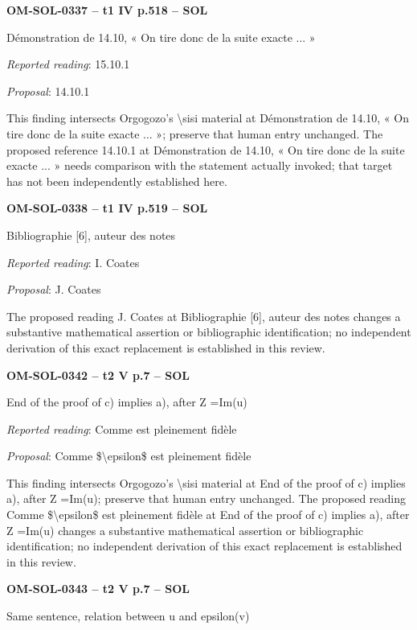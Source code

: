 \par\noindent\textbf{OM-SOL-0337 -- t1 IV p.518 -- SOL}\par
Démonstration de 14.10, « On tire donc de la suite exacte ... »\par
\emph{Reported reading}: 15.10.1\par
\emph{Proposal}: 14.10.1\par
This finding intersects Orgogozo's \textbackslash{}sisi material at Démonstration de 14.10, « On tire donc de la suite exacte ... »; preserve that human entry unchanged. The proposed reference 14.10.1 at Démonstration de 14.10, « On tire donc de la suite exacte ... » needs comparison with the statement actually invoked; that target has not been independently established here.\par
\par\noindent\textbf{OM-SOL-0338 -- t1 IV p.519 -- SOL}\par
Bibliographie [6], auteur des notes\par
\emph{Reported reading}: I. Coates\par
\emph{Proposal}: J. Coates\par
The proposed reading J. Coates at Bibliographie [6], auteur des notes changes a substantive mathematical assertion or bibliographic identification; no independent derivation of this exact replacement is established in this review.\par
\par\noindent\textbf{OM-SOL-0342 -- t2 V p.7 -- SOL}\par
End of the proof of c) implies a), after Z =\allowbreak  Im(u)\par
\emph{Reported reading}: Comme est pleinement fidèle\par
\emph{Proposal}: Comme \$\textbackslash{}epsilon\$ est pleinement fidèle\par
This finding intersects Orgogozo's \textbackslash{}sisi material at End of the proof of c) implies a), after Z =\allowbreak  Im(u); preserve that human entry unchanged. The proposed reading Comme \$\textbackslash{}epsilon\$ est pleinement fidèle at End of the proof of c) implies a), after Z =\allowbreak  Im(u) changes a substantive mathematical assertion or bibliographic identification; no independent derivation of this exact replacement is established in this review.\par
\par\noindent\textbf{OM-SOL-0343 -- t2 V p.7 -- SOL}\par
Same sentence, relation between u and epsilon(v)\par
